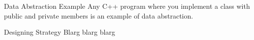 \documentclass[../lecture5-objectorientation.tex]{subfiles}
\begin{document}

\begin{frame}[fragile]{Data Abstraction Example}
    Any C++ program where you implement a class with public and private members is an example of data abstraction.
\end{frame}


\begin{frame}[fragile]{Designing Strategy}
    Blarg blarg blarg
\end{frame}

\end{document}
